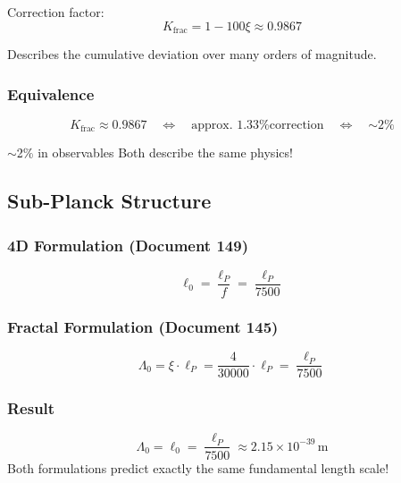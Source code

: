 	Correction factor:
	\begin{equation}
		K_{\text{frac}} = 1 - 100\xi \approx 0.9867
	\end{equation}
	
	Describes the cumulative deviation over many orders of magnitude.
	
	\subsubsection{Equivalence}
	
	\begin{equation}
		K_{\text{frac}} \approx 0.9867 \quad \Leftrightarrow \quad \text{approx.\ 1.33\% correction} \quad \Leftrightarrow \quad \text{$\sim$2\%}
	\end{equation}
	{$\sim$2\% in observables
	Both describe the same physics!
	
	\subsection{Sub-Planck Structure}
	
	\subsubsection{4D Formulation (Document 149)}
	
	\begin{equation}
		\ell_0 = \frac{\ell_P}{f} = \frac{\ell_P}{7500}
	\end{equation}
	
	\subsubsection{Fractal Formulation (Document 145)}
	
	\begin{equation}
		\Lambda_0 = \xi \cdot \ell_P = \frac{4}{30000} \cdot \ell_P = \frac{\ell_P}{7500}
	\end{equation}
	
	\subsubsection{Result}
	
	\begin{keyresult}
		\begin{equation}
			\boxed{\Lambda_0 = \ell_0 = \frac{\ell_P}{7500} \approx 2.15 \times 10^{-39}\,\text{m}}
		\end{equation}
		Both formulations predict exactly the same fundamental length scale!
	\end{keyresult}
	
}
